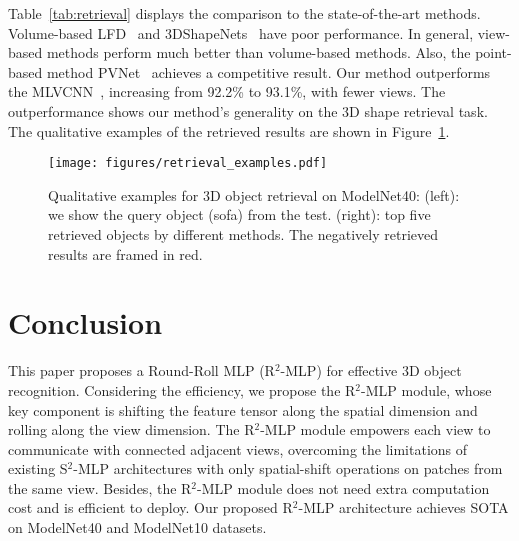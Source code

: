 \documentclass[11pt]{article}
\begin{document}
Table~\ref{tab:retrieval} displays the comparison to the state-of-the-art methods. Volume-based LFD~\citep{chen2003visual} and 3DShapeNets~\citep{chang2015shapenet} have poor performance. In general, view-based methods perform much better than volume-based methods. Also, the point-based method PVNet~\citep{you2018pvnet} achieves a competitive result. Our method outperforms the  MLVCNN~\citep{jiang2019mlvcnn}, increasing from 92.2\% to 93.1\%, with fewer views. The outperformance shows our method's generality on the 3D shape retrieval task.
The qualitative examples of the retrieved results are shown in Figure~\ref{fig:retr}.

\begin{figure}[htb!]
\centering
\texttt{[image: figures/retrieval\_examples.pdf]}
\caption{
Qualitative examples for 3D object retrieval on ModelNet40: (left): we show the query object (sofa) from the test. (right): top five retrieved objects by different methods.
The negatively retrieved results are framed in red.
}
\label{fig:retr}\vspace{0.5in}
\end{figure}




\section{Conclusion}
This paper proposes a Round-Roll MLP (R$^2$-MLP) for effective 3D object recognition. Considering the efficiency, we propose the R$^2$-MLP module, whose key component is shifting the feature tensor along the spatial dimension and rolling along the view dimension. The R$^2$-MLP module empowers each view to communicate with connected adjacent views, overcoming the limitations of existing S$^2$-MLP architectures with only spatial-shift operations on patches from the same view. Besides, the R$^2$-MLP module does not need extra computation cost and is efficient to deploy. Our proposed R$^2$-MLP architecture achieves SOTA on ModelNet40 and ModelNet10 datasets.




\end{document}
